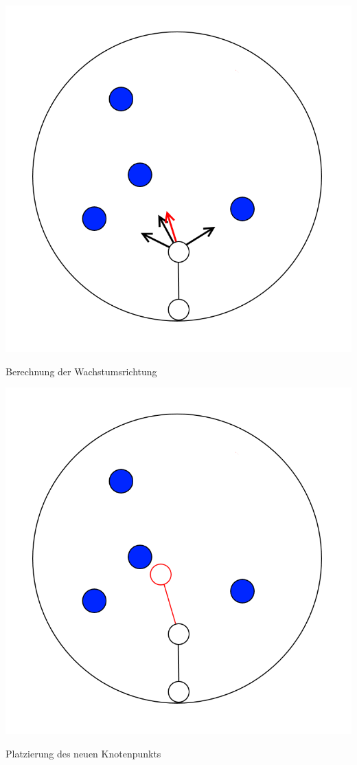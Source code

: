 \newpage
\begin{center}
	\includegraphics[height=.9\textheight]{images/CH3_SCA_Basic3.png}
	
	Berechnung der Wachstumsrichtung
\end{center}




\newpage
\begin{center}
	\includegraphics[height=.9\textheight]{images/CH3_SCA_Basic4.png}
	
	Platzierung des neuen Knotenpunkts
\end{center}




